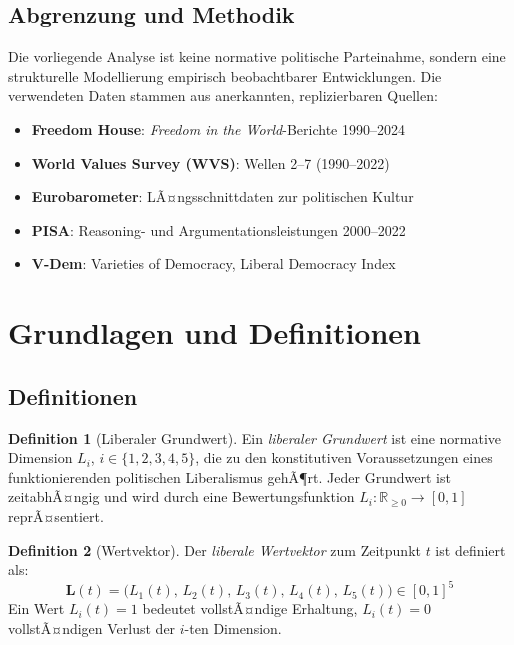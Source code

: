 ﻿\documentclass[a4paper,12pt]{article}
\theoremstyle{definition}
\newtheorem{definition}{Definition}
\begin{document}
\subsection{Abgrenzung und Methodik}

Die vorliegende Analyse ist keine normative politische Parteinahme, sondern eine strukturelle Modellierung empirisch beobachtbarer Entwicklungen. Die verwendeten Daten stammen aus anerkannten, replizier\-baren Quellen:

\begin{itemize}
	\item \textbf{Freedom House}: \textit{Freedom in the World}-Berichte 1990--2024 \cite{FH2024}
	\item \textbf{World Values Survey (WVS)}: Wellen 2--7 (1990--2022) \cite{WVS2022}
	\item \textbf{Eurobarometer}: LÃ¤ngsschnittdaten zur politischen Kultur \cite{EB2023}
	\item \textbf{PISA}: Reasoning- und Argumentationsleistungen 2000--2022 \cite{PISA2022}
	\item \textbf{V-Dem}: Varieties of Democracy, Liberal Democracy Index \cite{VDEM2024}
\end{itemize}

\section{Grundlagen und Definitionen}

\subsection{Definitionen}

\begin{definition}[Liberaler Grundwert]
Ein \emph{liberaler Grundwert} ist eine normative Dimension $L_i$, $i \in \{1, 2, 3, 4, 5\}$, die zu den konstitutiven Voraussetzungen eines funktionierenden politischen Liberalismus gehÃ¶rt. Jeder Grundwert ist zeitabhÃ¤ngig und wird durch eine Bewertungsfunktion $L_i : \mathbb{R}_{\geq 0} \to [0,1]$ reprÃ¤sentiert.
\end{definition}

\begin{definition}[Wertvektor]
Der \emph{liberale Wertvektor} zum Zeitpunkt $t$ ist definiert als:
\[
\mathbf{L}(t) = \bigl(L_1(t),\, L_2(t),\, L_3(t),\, L_4(t),\, L_5(t)\bigr) \in [0,1]^5
\]
Ein Wert $L_i(t) = 1$ bedeutet vollstÃ¤ndige Erhaltung, $L_i(t) = 0$ vollstÃ¤ndigen Verlust der $i$-ten Dimension.
\end{definition}
\end{document}
